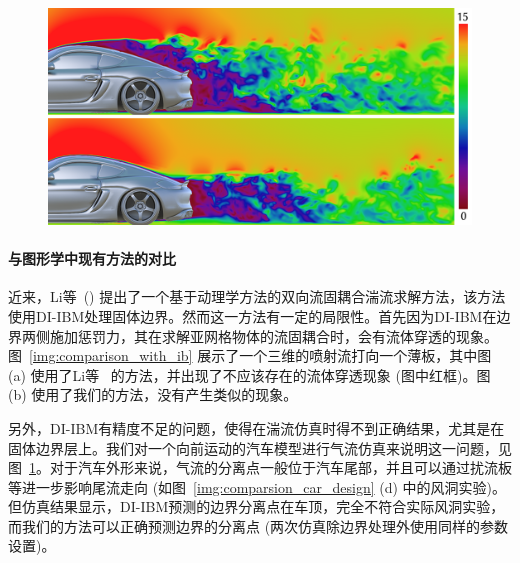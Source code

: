 \begin{figure}[htbp]
  \centering
    \includegraphics[width=0.95\columnwidth]{figures/comparsion_car_ib_ours.png}
  \label{img:comparsion_car_ib_ours}
\end{figure}

\paragraph{与图形学中现有方法的对比}
近来，Li等~(\citeyear{Li-2020}) 提出了一个基于动理学方法的双向流固耦合湍流求解方法，该方法使用DI-IBM处理固体边界。然而这一方法有一定的局限性。首先因为DI-IBM在边界两侧施加惩罚力，其在求解亚网格物体的流固耦合时，会有流体穿透的现象。图~\ref{img:comparison_with_ib} 展示了一个三维的喷射流打向一个薄板，其中图 (a) 使用了Li等~\citeyear{Li-2020} 的方法，并出现了不应该存在的流体穿透现象 (图中红框)。图 (b) 使用了我们的方法，没有产生类似的现象。

另外，DI-IBM有精度不足的问题，使得在湍流仿真时得不到正确结果，尤其是在固体边界层上。我们对一个向前运动的汽车模型进行气流仿真来说明这一问题，见图~\ref{img:comparsion_car_ib_ours}。对于汽车外形来说，气流的分离点一般位于汽车尾部，并且可以通过扰流板等进一步影响尾流走向 (如图~\ref{img:comparsion_car_design} (d) 中的风洞实验)。但仿真结果显示，DI-IBM预测的边界分离点在车顶，完全不符合实际风洞实验，而我们的方法可以正确预测边界的分离点 (两次仿真除边界处理外使用同样的参数设置)。

